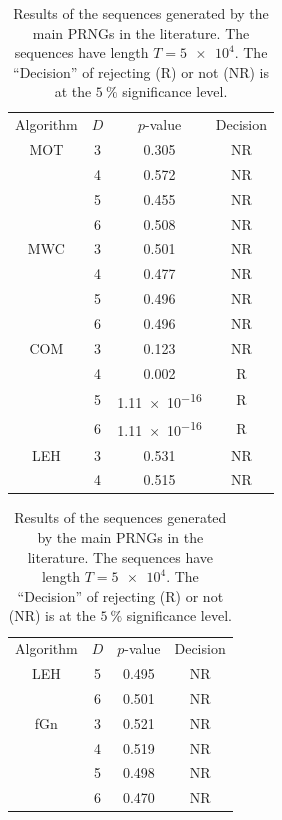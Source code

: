 \documentclass[alpha-refs]{wiley-article}
\begin{document}
\begin{table}
\caption{Results of the sequences generated by the main PRNGs in the literature. 
	The sequences have length $T=\num[scientific-notation = true]{5 e4}$. 
	The ``Decision'' of rejecting (R) or not (NR) is at the $\SI{5}{\percent}$ significance level.}
\label{Tab:LiteratureComparations}
\centering
\begin{tabular}{cccc}
	\toprule
	Algorithm & 
	\multicolumn{1}{c}{$D$} & 
	$p$-value &
	Decision\\
	\cmidrule(lr){1-1}
	\cmidrule(lr){2-2}
	\cmidrule(lr){3-3}
	\cmidrule(lr){4-4}
	MOT & 3 & 0.305 & NR\\
	& 4 & 0.572 & NR\\ 
	& 5 & 0.455 & NR\\ 
	& 6 & 0.508 & NR\\ 
	\cmidrule(lr){1-4}
	MWC & 3 & 0.501 & NR\\
	& 4 & 0.477 & NR\\ 
	& 5 & 0.496 & NR\\ 
	& 6 & 0.496 & NR\\ 
	\cmidrule(lr){1-4}
	COM & 3 & 0.123 & NR\\
	& 4 & 0.002 & R\\ 
	& 5 & \num[scientific-notation=true]{1.11 e-16} & R\\ 
	& 6 & \num[scientific-notation=true]{1.11 e-16} & R\\ 
	\cmidrule(lr){1-4}
	LEH & 3 & 0.531 & NR\\
	& 4 & 0.515 & NR\\ 
	\bottomrule
\end{tabular}
\begin{tabular}{|cccc}
	\toprule
	Algorithm & 
	\multicolumn{1}{c}{$D$} & 
	$p$-value &
	Decision\\
	\cmidrule(lr){1-1}
	\cmidrule(lr){2-2}
	\cmidrule(lr){3-3}
	\cmidrule(lr){4-4}
	LEH & 5 & 0.495 & NR\\ 
	& 6 & 0.501 & NR\\ 
	\cmidrule(lr){1-4}
	fGn & 3 & 0.521 & NR\\
	& 4 & 0.519 & NR\\ 
	& 5 & 0.498 & NR\\ 
	& 6 & 0.470 & NR\\
	\cmidrule(lr){1-4}

\end{tabular}
\end{table}
\end{document}
